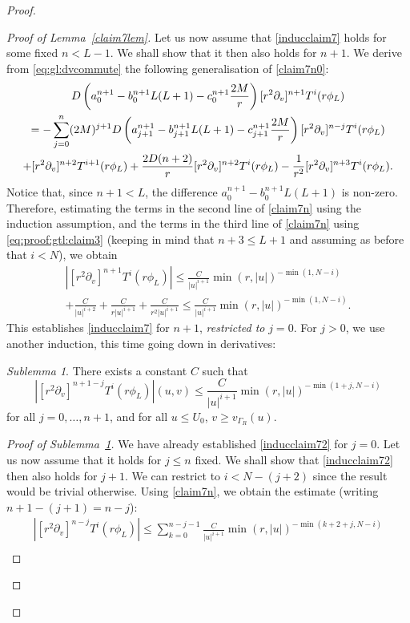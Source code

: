 \documentclass[11pt,english]{article}
\numberwithin{equation}{section}
\theoremstyle{remark}
\theoremstyle{plain}
\theoremstyle{remark}
\newtheorem{subclaim}{Sublemma}
\newcommand{\pv}{\partial_v}
\renewcommand{\(}{\left(}
\renewcommand{\)}{\right)}
\begin{document}
\begin{proof}
\begin{proof}[Proof of Lemma~\ref{claim7lem}]
Let us now assume that \eqref{inducclaim7} holds for some fixed $n<L-1$. We shall show that it then also holds for $n+1$. We derive from \eqref{eq:gl:dvcommute} the following generalisation of \eqref{claim7n0}:
\begin{multline}\label{claim7n}
D\left(a_0^{n+1}-b_0^{n+1}L(L+1)-c_0^{n+1}\frac{2M}{r}\right)[r^2\pv]^{n+1}T^i(r\phi_L)\\
=-\sum_{j=0}^n(2M)^{j+1}D\left(a_{j+1}^{n+1}-b_{j+1}^{n+1}L(L+1)-c_{j+1}^{n+1}\frac{2M}{r}\right)[r^2\pv]^{n-j}T^i(r\phi_L)\\
+[r^2\pv]^{n+2} T^{i+1}(r\phi_L)+\frac{2D(n+2)}{r}[r^2\pv]^{n+2}T^i(r\phi_L)-\frac{1}{r^2}\pvx{n+3}T^i(r\phi_L).
\end{multline}
Notice that, since $n+1<L$, the difference $a_0^{n+1}-b_0^{n+1}L(L+1)$ is non-zero. Therefore, estimating the terms in the second line of \eqref{claim7n} using the induction assumption, and the terms in the third line of \eqref{claim7n} using \eqref{eq:proof:gtl:claim3} (keeping in mind that $n+3\leq L+1$ and assuming as before that $i<N$), we obtain
\begin{multline}
\left|	[r^2\pv]^{n+1}T^i(r\phi_L)	\right| \leq \frac{C}{|u|^{i+1}}\min(r, |u|)^{-\min(1,N-i)}\\
+\frac{C}{|u|^{i+2}}+\frac{C}{r|u|^{i+1}}+\frac{C}{r^2|u|^{i+1}}\leq \frac{C}{|u|^{i+1}}\min(r, |u|)^{-\min(1,N-i)}.
\end{multline}
This establishes \eqref{inducclaim7} for $n+1$, \textit{restricted to} $j=0$. For $j>0 $, we use another induction, this time going down in derivatives:
	\begin{subclaim}\label{subclaim}
	There exists a constant $C$ such that
	\begin{equation}
	\left|[r^2\pv]^{n+1-j}T^i(r\phi_L)\right|(u,v)\leq \frac{C}{|u|^{i+1}}\min(r,|u|)^{-\min(1+j, N-i)}\label{inducclaim72}
	\end{equation}
	for all $j=0,\dots, n+1$, and for all $u\leq U_0$, $v\geq v_{\Gamma_R}(u)$.
	\end{subclaim}
\begin{proof}[Proof of Sublemma~\ref{subclaim}]
We have already established \eqref{inducclaim72} for $j=0$. 
Let us now assume that it holds for $j\leq n$  fixed. 
We shall show that \eqref{inducclaim72} then also holds for $j+1$. 
We can restrict to $i< N-(j+2)$ since the result would be trivial otherwise.
Using \eqref{claim7n}, we obtain the estimate (writing $n+1-(j+1)=n-j$):
\begin{multline}
|[r^2\pv]^{n-j}T^i(r\phi_L)|\leq \sum_{k=0}^{n-j-1}\frac{C}{|u|^{i+1}}\min(r,|u|)^{-\min(k+2+j, N-i)}\\

\end{multline}
\end{proof}
\end{proof}
\end{proof}
\end{document}
